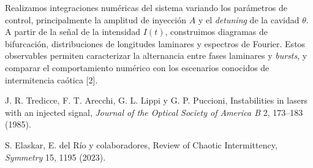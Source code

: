 \documentclass[11pt,a4paper]{article}
\begin{document}
\begin{sincabstract}
Realizamos integraciones numéricas del sistema variando los parámetros de control, principalmente la amplitud de inyección $A$ y el \textit{detuning} de la cavidad $\theta$. A partir de la señal de la intensidad $I(t)$, construimos diagramas de bifurcación, distribuciones de longitudes laminares y espectros de Fourier. Estos observables permiten caracterizar la alternancia entre fases laminares y \textit{bursts}, y comparar el comportamiento numérico con los escenarios conocidos de intermitencia caótica [2].


\begin{enumerate}[label={[\arabic*]},leftmargin=*]
\item J. R. Tredicce, F. T. Arecchi, G. L. Lippi y G. P. Puccioni, Instabilities in lasers with an injected signal, \textit{Journal of the Optical Society of America B} 2, 173--183 (1985).
\item S. Elaskar, E. del Río y colaboradores, Review of Chaotic Intermittency, \textit{Symmetry} 15, 1195 (2023).
\end{enumerate}
\end{sincabstract}

\end{document}
